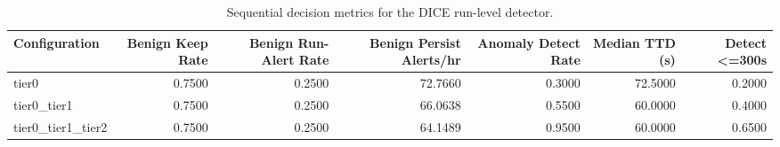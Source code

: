 \begin{table}[t]
\centering
\caption{Sequential decision metrics for the DICE run-level detector.}
\label{tab:dice_sequential_metrics}
\footnotesize
\begin{tabular}{lrrrrrr}
\toprule
Configuration & Benign Keep Rate & Benign Run-Alert Rate & Benign Persist Alerts/hr & Anomaly Detect Rate & Median TTD (s) & Detect <=300s \\
\midrule
tier0 & 0.7500 & 0.2500 & 72.7660 & 0.3000 & 72.5000 & 0.2000 \\
tier0_tier1 & 0.7500 & 0.2500 & 66.0638 & 0.5500 & 60.0000 & 0.4000 \\
tier0_tier1_tier2 & 0.7500 & 0.2500 & 64.1489 & 0.9500 & 60.0000 & 0.6500 \\
\bottomrule
\end{tabular}

\end{table}
